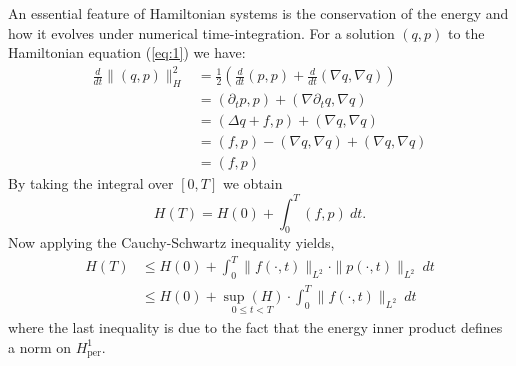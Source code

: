 \documentclass[12pt]{article}
\begin{document}
An essential feature of Hamiltonian systems is the conservation of the energy and how it evolves under numerical time-integration. For a solution $(q,p)$ to the Hamiltonian equation (\ref{eq:1}) we have:
\begin{equation} \label{eq:10}
\begin{aligned}
	\frac{d}{dt} \|(q,p) \|_H^2 &= \frac 1 2 \left( \frac{d}{dt}(p,p) + \frac{d}{dt}(\nabla q,\nabla q) \right) \\
	& = (\partial_t p, p) + (\nabla \partial_t q , \nabla q) \\
	& = ( \Delta q + f , p ) + (\nabla q , \nabla q) \\
	& = (f,p) - (\nabla q , \nabla q) + (\nabla q , \nabla q) \\
	& = (f,p)
\end{aligned}
\end{equation}
By taking the integral over $[0,T]$ we obtain
\begin{equation} \label{eq:11}
	H(T) = H(0) + \int_0^T (f,p)\ dt.
\end{equation}
Now applying the Cauchy-Schwartz inequality yields,
\begin{equation} \label{eq:12}
\begin{aligned}
	H(T) &\leq H(0) + \int_0^T \| f(\cdot,t) \|_{L^2} \cdot \| p(\cdot,t) \|_{L^2} \ dt \\
	&\leq H(0) + \underset{0\leq t < T}{\sup(H)} \cdot \int_0^T \| f(\cdot,t) \|_{L^2} \ dt
\end{aligned}
\end{equation}
where the last inequality is due to the fact that the energy inner product defines a norm on $H^1_{\text{per}}$.
\end{document}

